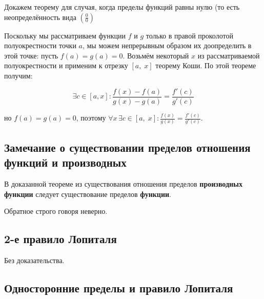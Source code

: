 Докажем теорему для случая, когда пределы функций равны нулю (то есть неопределённость вида $\left(\frac{0}{0}\right)$

Поскольку мы рассматриваем функции $f$ и $g$ только в правой проколотой полуокрестности точки $a$, мы можем непрерывным образом их доопределить в этой точке: пусть $f(a)=g(a)=0$. Возьмём некоторый $x$ из рассматриваемой полуокрестности и применим к отрезку $[a,\;x]$ теорему Коши. По этой теореме получим:

$$
\exists c \in [a,x]\!:\frac{f(x)-f(a)}{g(x)-g(a)}=\frac{f'(c)}{g'(c)}
$$

но $f(a)=g(a)=0$, поэтому $\forall x\, \exists c \in [a,\;x]\!:\frac{f(x)}{g(x)}=\frac{f'(c)}{g'(c)}$.

\subsection{Замечание о существовании пределов отношения функций и производных}

В доказанной теореме из существования отношения пределов \textbf{производных функции} 
следует существование пределов \textbf{функции}.

Обратное строго говоря неверно.


\subsection{2-е правило Лопиталя}

Без доказательства.

\subsection{Односторонние пределы и правило Лопиталя}

